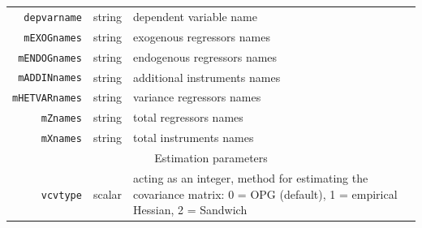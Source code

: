 \documentclass[a4paper,10pt]{article}
\begin{document}
\begin{footnotesize}
\begin{tabular}{rlp{}}
  \hline
  \texttt{depvarname}  & string & dependent variable name\\
  \texttt{mEXOGnames}  & string & exogenous regressors names \\
  \texttt{mENDOGnames} & string & endogenous regressors names \\
  \texttt{mADDINnames} & string & additional instruments names \\
  \texttt{mHETVARnames}& string & variance regressors names \\
  \texttt{mZnames}     & string & total regressors names \\
  \texttt{mXnames}     & string & total instruments names \\
  \hline
  \multicolumn{3}{c}{Estimation parameters} \\
  \hline
  \texttt{vcvtype}  & scalar & acting as an integer, method for estimating the 
  covariance matrix: 0 = OPG (default), 1 = empirical Hessian, 2 =
  Sandwich \\
  \hline
\end{tabular}
\end{footnotesize}
\end{document}
